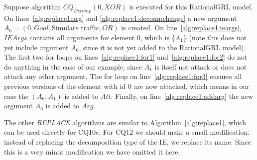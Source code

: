 Suppose algorithm $CQ_{Decomp}(0, XOR)$ is executed for this RationalGRL model. On lines~\ref{alg:replace1:arg} and \ref{alg:replace1:decompchange} a new argument $A_6=(0,Goal,\text{Simulate traffic},OR)$ is created. On line~\ref{alg:replace1:ieargs}, $IEArgs$ contains all arguments for element 0, which is $\{A_1\}$ (note this does not yet include argument $A_6$, since it is not yet added to the RationalGRL model). The first two for loops on lines~\ref{alg:replace1:for1} and~\ref{alg:replace1:for2} do not do anything in the case of our example, since $A_1$ is itself not attack or does not attack any other argument. The for loop on line~\ref{alg:replace1:for3} ensures all previous versions of the element with id 0 are now attacked, which means in our case the $(A_6,A_1)$ is added to $Att$. Finally, on line~\ref{alg:replace1:addarg} the new argument $A_6$ is added to $Arg$.

The other \emph{REPLACE} algorithms are similar to Algorithm~\ref{alg:replace1}, which can be used directly for CQ10c. For CQ12 we should make a small modification: instead of replacing the decomposition type of the IE, we replace its name. Since this is a very minor modification we have omitted it here.